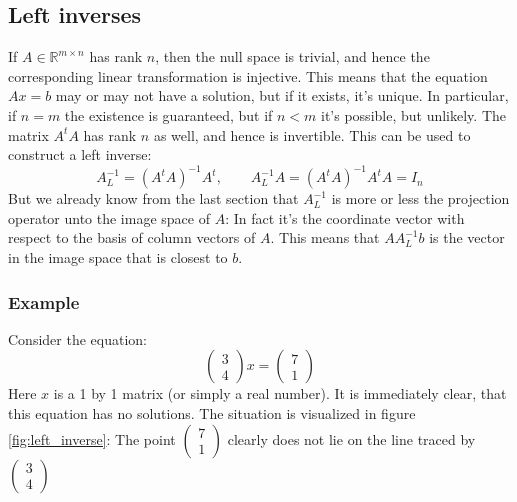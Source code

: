\documentclass[12pt, a4paper]{article}
\numberwithin{equation}{section}
\begin{document}
\subsection{Left inverses}
If $A\in\mathbb{R}^{m\times n}$ has rank $n$, then the null space is trivial, and hence the corresponding linear transformation is injective. This means that the equation $Ax=b$ may or may not have a solution, but if it exists, it's unique. In particular, if $n=m$ the existence is guaranteed, but if $n<m$ it's possible, but unlikely. The matrix $A^tA$ has rank $n$ as well, and hence is invertible. This can be used to construct a left inverse:
\begin{equation}
A^{-1}_L=(A^t A)^{-1}A^t,\qquad A^{-1}_L A=(A^t A)^{-1}A^t A=I_n
\end{equation}
But we already know from the last section that $A^{-1}_L$ is more or less the projection operator unto the image space of $A$: In fact it's the coordinate vector with respect to the basis of column vectors of $A$. This means that $AA^{-1}_Lb$ is the vector in the image space that is closest to $b$. 

\subsubsection{Example}
Consider the equation:
\begin{equation}
\label{impossible_equation}
\begin{pmatrix}
3 \\ 4
\end{pmatrix}
x=
\begin{pmatrix}
7 \\ 1
\end{pmatrix}
\end{equation}
Here $x$ is a 1 by 1 matrix (or simply a real number). It is immediately clear, that this equation has no solutions. The situation is visualized in figure \ref{fig:left_inverse}: The point $\begin{pmatrix}7 \\ 1\end{pmatrix}$ clearly does not lie on the line traced by $\begin{pmatrix}3 \\ 4\end{pmatrix}$
\end{document}
